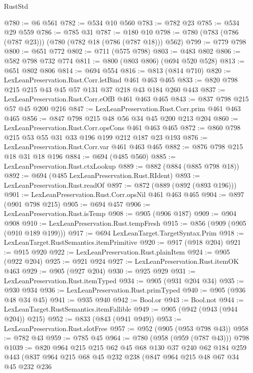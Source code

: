\begin{lexlean}{RustStd}
\begin{coremodule}
{\begin{coremodule}
{{{{{@780 := @6 @561
@782 := @534 @10 @560
@783 := @782 @23
@785 := @534 @29 @559
@786 := @785 @31
@787 := @180 @10
@798 := @780 (@783 (@786 (@787 @23))) (@780 (@782 @18 (@786 (@787 @18))) @562)
@799 := @779 @798
@800 := @651 @772
@802 := @711 (@575 @798)
@803 := @483 @802
@806 := @582 @798 @732 @774
@811 := @800 (@803 @806) (@694 @520 @528)
@813 := @651 @802 @806
@814 := @694 @554
@816 := @813 (@814 @710)
@820 := LexLeanPreservation.Rust.Corr.letBind @461 @463 @465
@833 := @820 @798 @215 @215 @43 @45 @57 @131 @37 @218 @43 @184 @260 @443
@837 := LexLeanPreservation.Rust.Corr.eOfB @461 @463 @465
@843 := @837 @798 @215 @57 @45 @200 @216
@847 := LexLeanPreservation.Rust.Corr.prim @461 @463 @465
@856 := @847 @798 @215 @48 @56 @34 @45 @200 @213 @204
@860 := LexLeanPreservation.Rust.Corr.opsCons @461 @463 @465
@872 := @860 @798 @215 @53 @55 @31 @33 @196 @199 @212 @187 @23 @193
@876 := LexLeanPreservation.Rust.Corr.var @461 @463 @465
@882 := @876 @798 @215 @18 @31 @18 @196
@884 := @694 (@485 @560)
@885 := LexLeanPreservation.Rust.ctxLookup
@889 := @882 (@884 (@885 @798 @18))
@892 := @694 (@485 LexLeanPreservation.Rust.RIdent)
@893 := LexLeanPreservation.Rust.readOf
@897 := @872 (@889 (@892 (@893 @196)))
@901 := LexLeanPreservation.Rust.Corr.opsNil @461 @463 @465
@904 := @897 (@901 @798 @215)
@905 := @694 @457
@906 := LexLeanPreservation.Rust.isTemp
@908 := @905 (@906 @187)
@909 := @904 @908
@910 := LexLeanPreservation.Rust.tempFresh
@915 := @856 (@909 (@905 (@910 @189 @199)))
@917 := @694 LexLeanTarget.TargetSyntax.Prim
@918 := LexLeanTarget.RustSemantics.itemPrimitive
@920 := @917 (@918 @204)
@921 := @915 @920
@922 := LexLeanPreservation.Rust.plainItem
@924 := @905 (@922 @204)
@925 := @921 @924
@927 := LexLeanPreservation.Rust.itemOK @463
@929 := @905 (@927 @204)
@930 := @925 @929
@931 := LexLeanPreservation.Rust.itemTyped
@934 := @905 (@931 @204 @34)
@935 := @930 @934
@936 := LexLeanPreservation.Rust.primTyped
@940 := @905 (@936 @48 @34 @45)
@941 := @935 @940
@942 := Bool.or
@943 := Bool.not
@944 := LexLeanTarget.RustSemantics.itemFallible
@949 := @905 (@942 (@943 (@944 @204)) @215)
@952 := @833 (@843 (@941 @949))
@953 := LexLeanPreservation.Rust.slotFree
@957 := @952 (@905 (@953 @798 @43))
@958 := @782 @43
@959 := @785 @45
@964 := @780 (@958 (@959 (@787 @43))) @798
@1039 := @820
    @964
    @215
    @215
    @62
    @45
    @68
    @130
    @37
    @240
    @62
    @184
    @259
    @443
    (@837
      @964
      @215
      @68
      @45
      @232
      @238
      (@847
        @964
        @215
        @48
        @67
        @34
        @45
        @232
        @236
}}}}}
\end{coremodule}}
\end{coremodule}
\end{lexlean}
